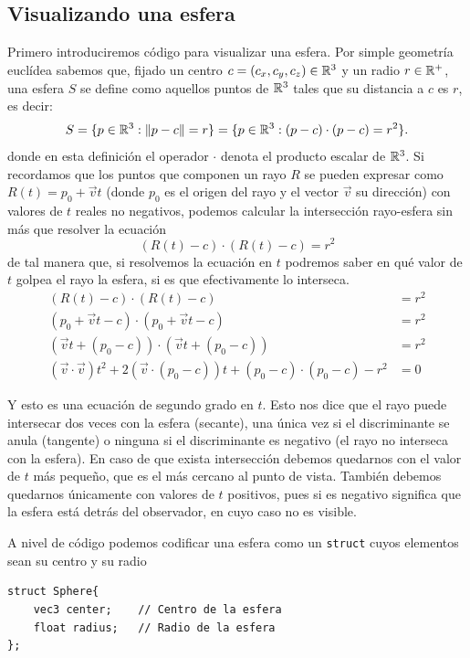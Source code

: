 \subsection{Visualizando una esfera}
\label{subsection:esfera}

Primero introduciremos código para visualizar una esfera. Por simple geometría euclídea sabemos que, fijado un centro $c=(c_x,c_y,c_z)\in\mathbb{R}^3$ y un radio $r\in\mathbb{R}^+$, una esfera $S$ se define como aquellos puntos de $\mathbb{R}^3$ tales que su distancia a $c$ es $r$, es decir:
$$
S = \{p\in\mathbb{R}^3:\|p-c\|=r\} = \{p\in\mathbb{R}^3:(p-c)\cdot (p-c)=r^2\}. 
$$
donde en esta definición el operador $\cdot$ denota el producto escalar de $\mathbb{R}^3$. Si recordamos que los puntos que componen un rayo $R$ se pueden expresar como $R(t)= p_0 + \vec vt$ (donde $p_0$ es el origen del rayo y el vector $\vec v$ su dirección) con valores de $t$ reales no negativos, podemos calcular la intersección rayo-esfera sin más que resolver la ecuación
$$
(R(t)-c)\cdot(R(t)-c)=r^2
$$
de tal manera que, si resolvemos la ecuación en $t$ podremos saber en qué valor de $t$ golpea el rayo la esfera, si es que efectivamente lo interseca.
\begin{equation}
    \label{eq:rayo-recta}
    \begin{split}
        (R(t)-c)\cdot(R(t)-c)&=r^2 \\
        (p_0 + \vec vt - c)\cdot(p_0 + \vec vt - c) &= r^2 \\
        (\vec vt + (p_0 -c))\cdot (\vec vt + (p_0 -c))&= r^2 \\
        (\vec v\cdot \vec v)t^2 + 2(\vec v\cdot(p_0-c))t + (p_0 -c)\cdot (p_0 -c) - r^2 &= 0 
    \end{split}
\end{equation}

Y esto es una ecuación de segundo grado en $t$. Esto nos dice que el rayo puede intersecar dos veces con la esfera (secante), una única vez si el discriminante se anula (tangente) o ninguna si el discriminante es negativo (el rayo no interseca con la esfera). En caso de que exista intersección debemos quedarnos con el valor de $t$ más pequeño, que es el más cercano al punto de vista. También debemos quedarnos únicamente con valores de $t$ positivos, pues si es negativo significa que la esfera está detrás del observador, en cuyo caso no es visible.

A nivel de código podemos codificar una esfera como un \verb|struct| cuyos elementos sean su centro y su radio

\begin{lstlisting}
struct Sphere{
    vec3 center;    // Centro de la esfera
    float radius;   // Radio de la esfera
};
\end{lstlisting}

